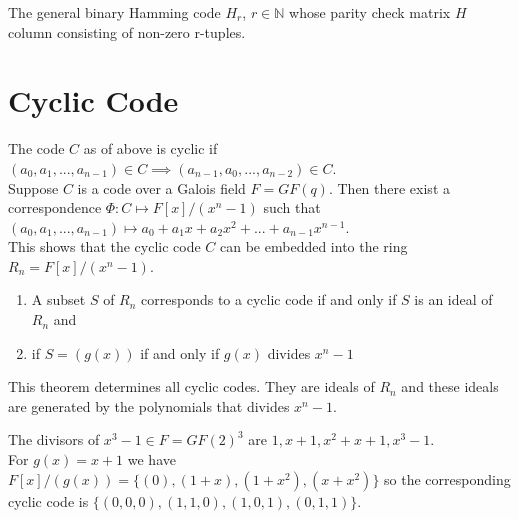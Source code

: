 \begin{example}
    The general binary Hamming code \(H_r\), \(r \in \mathbb{N}\) whose parity check matrix \(H\) column consisting of non-zero r-tuples.
\end{example}

\section{Cyclic Code}
The code \(C\) as of above is cyclic if \((a_0,a_1,...,a_{n-1}) \in C \implies (a_{n-1},a_0,...,a_{n-2}) \in C\).\\

Suppose \(C\) is a code over a Galois field \(F=GF(q)\). Then there exist a correspondence \(\Phi : C \mapsto F[x]/(x^n-1)\) such that \((a_0,a_1,...,a_{n-1})\longmapsto a_0+a_1x+a_2x^2+...+a_{n-1}x^{n-1}\).\\
This shows that the cyclic code \(C\) can be embedded into the ring \(R_n=F[x]/(x^n-1)\).

\begin{theorem}
\begin{enumerate}
    \item A subset \(S\) of \(R_n\) corresponds to a cyclic code if and only if \(S\) is an ideal of \(R_n\) and
    \item if \(S=(g(x))\) if and only if  \(g(x)\) divides \(x^n-1\)
    \end{enumerate}
\end{theorem}

This theorem determines all cyclic codes. They are ideals of \(R_n\) and these ideals are generated by the polynomials that divides \(x^n-1\).

\begin{example}
    The divisors of \(x^3-1 \in F=GF(2)^{3}\) are \(1, x+1, x^2+x+1, x^3-1\).\\
    For \(g(x)=x+1\) we have \(F[x]/(g(x))=\{(0),(1+x),(1+x^2),(x+x^2)\}\) so the corresponding cyclic code is \(\{(0,0,0),(1,1,0),(1,0,1),(0,1,1)\}\). 
\end{example}
